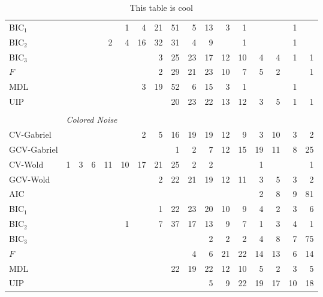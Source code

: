 \begin{table}
\begin{tabular}{lrrrrrrrrrrrrrrrr}
 BIC$_1$ &  &  &  &  &  1 &  4 &  21 &  51 &  5 &  13 &  3 &  1 &  &  &  1 & \\ 
 BIC$_2$ &  &  &  &  2 &  4 &  16 &  32 &  31 &  4 &  9 &  &  1 &  &  &  1 & \\ 
 BIC$_3$ &  &  &  &  &  &  &  3 &  25 &  23 &  17 &  12 &  10 &  4 &  4 &  1 &  1\\ 
 $F$ &  &  &  &  &  &  &  2 &  29 &  21 &  23 &  10 &  7 &  5 &  2 &  &  1\\ 
 MDL &  &  &  &  &  &  3 &  19 &  52 &  6 &  15 &  3 &  1 &  &  &  1 & \\ 
 UIP &  &  &  &  &  &  &  &  20 &  23 &  22 &  13 &  12 &  3 &  5 &  1 &  1\\ 
        \\
        &\multicolumn{16}{l}{\scriptsize{\textit{Colored Noise}}} \\
CV-Gabriel &  &  &  &  &  &  2 &  5 &  16 &  19 &  19 &  12 &  9 &  3 &  10 &  3 &  2\\ 
 GCV-Gabriel &  &  &  &  &  &  &  &  1 &  2 &  7 &  12 &  15 &  19 &  11 &  8 &  25\\ 
 CV-Wold &  1 &  3 &  6 &  11 &  10 &  17 &  21 &  25 &  2 &  2 &  &  &  1 &  &  &  1\\ 
 GCV-Wold &  &  &  &  &  &  &  2 &  22 &  21 &  19 &  12 &  11 &  3 &  5 &  3 &  2\\ 
 AIC &  &  &  &  &  &  &  &  &  &  &  &  &  2 &  8 &  9 &  81\\ 
 BIC$_1$ &  &  &  &  &  &  &  1 &  22 &  23 &  20 &  10 &  9 &  4 &  2 &  3 &  6\\ 
 BIC$_2$ &  &  &  &  &  1 &  &  7 &  37 &  17 &  13 &  9 &  7 &  1 &  3 &  4 &  1\\ 
 BIC$_3$ &  &  &  &  &  &  &  &  &  &  2 &  2 &  2 &  4 &  8 &  7 &  75\\ 
 $F$ &  &  &  &  &  &  &  &  &  4 &  6 &  21 &  22 &  14 &  13 &  6 &  14\\ 
 MDL &  &  &  &  &  &  &  &  22 &  19 &  22 &  12 &  10 &  5 &  2 &  3 &  5\\ 
 UIP &  &  &  &  &  &  &  &  &  &  5 &  9 &  22 &  19 &  17 &  10 &  18\\ 
        \bottomrule
    \end{tabular}
    \caption{
        This table is cool
    }
\end{table}

